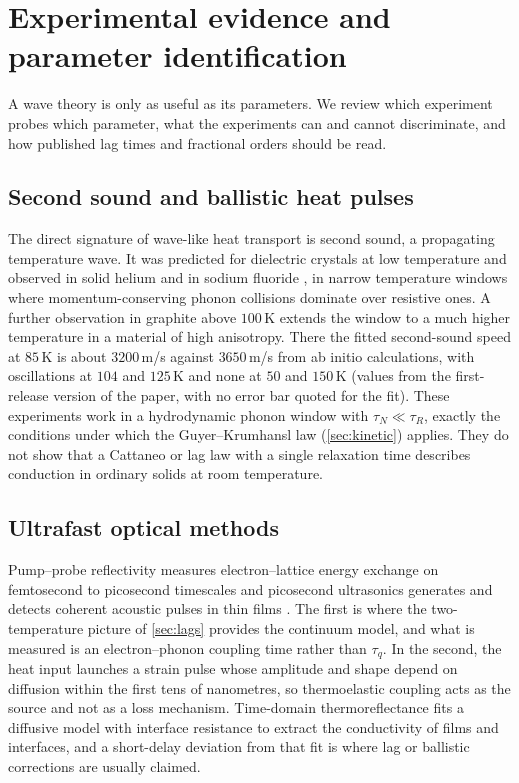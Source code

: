 \section{Experimental evidence and parameter identification}\label{sec:experiments}

A wave theory is only as useful as its parameters. We review which experiment probes which parameter, what the experiments can and cannot discriminate, and how published lag times and fractional orders should be read.

\subsection{Second sound and ballistic heat pulses}
The direct signature of wave-like heat transport is second sound, a propagating temperature wave. It was predicted for dielectric crystals at low temperature \citep{Chester1963,GuyerKrumhansl1966} and observed in solid helium \citep{Ackerman1966} and in sodium fluoride \citep{McNelly1970,Jackson1970}, in narrow temperature windows where momentum-conserving phonon collisions dominate over resistive ones. A further observation in graphite above $100$\,K \citep{Huberman2019} extends the window to a much higher temperature in a material of high anisotropy. There the fitted second-sound speed at $85$\,K is about $3200$\,m/s against $3650$\,m/s from ab initio calculations, with oscillations at $104$ and $125$\,K and none at $50$ and $150$\,K (values from the first-release version of the paper, with no error bar quoted for the fit). These experiments work in a hydrodynamic phonon window with $\tau_N\ll\tau_R$, exactly the conditions under which the Guyer--Krumhansl law (\cref{sec:kinetic}) applies. They do not show that a Cattaneo or lag law with a single relaxation time describes conduction in ordinary solids at room temperature.

\subsection{Ultrafast optical methods}
Pump--probe reflectivity measures electron--lattice energy exchange on femtosecond to picosecond timescales \citep{Brorson1987} and picosecond ultrasonics generates and detects coherent acoustic pulses in thin films \citep{Thomsen1986}. The first is where the two-temperature picture of \cref{sec:lags} provides the continuum model, and what is measured is an electron--phonon coupling time rather than $\tau_q$. In the second, the heat input launches a strain pulse whose amplitude and shape depend on diffusion within the first tens of nanometres, so thermoelastic coupling acts as the source and not as a loss mechanism. Time-domain thermoreflectance \citep{Cahill2003} fits a diffusive model with interface resistance to extract the conductivity of films and interfaces, and a short-delay deviation from that fit is where lag or ballistic corrections are usually claimed.

